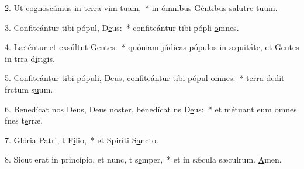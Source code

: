 2. Ut cognoscámus in terra vim t\uline{u}am,~* in ómnibus Géntibus salutre t\uline{u}um.\par 
3. Confiteántur tibi pópul, D\uline{e}us:~* confiteántur tibi pópli \uline{o}mnes.\par 
4. Læténtur et exsúltnt G\uline{e}ntes:~* quóniam júdicas pópulos in æquitáte, et Gentes in trra d\uline{í}rigis.\par 
5. Confiteántur tibi pópuli, Deus, confiteántur tibi pópul \uline{o}mnes:~* terra dedit frctum s\uline{u}um.\par 
6. Benedícat nos Deus, Deus noster, benedícat ns D\uline{e}us:~* et métuant eum omnes fnes t\uline{e}rræ.\par 
7. Glória Patri, t F\uline{í}lio,~* et Spiríti S\uline{a}ncto.\par 
8. Sicut erat in princípio, et nunc, t s\uline{e}mper,~* et in sǽcula sæculrum. \uline{A}men.\par 
